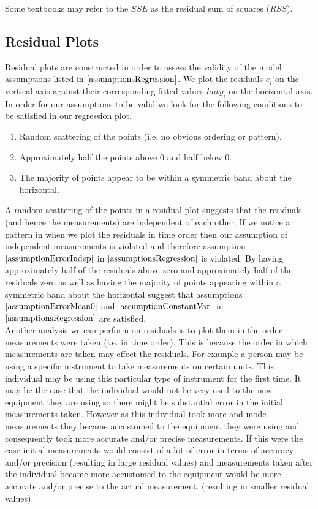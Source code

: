 \begin{nt}
Some textbooks may refer to the $SSE$ as the
residual sum of squares ($RSS$).
\end{nt}

\subsection{Residual Plots}

Residual plots are constructed in order to assess the validity of the model assumptions
listed in $\ref{assumptionsRegression}$.
We plot the residuals $e_{i}$ on the vertical axis
against their corresponding fitted values $hat{y}_{i}$ on the horizontal axis.
In order for our assumptions to be valid we look for the following
conditions to be satisfied in our regression plot.

\begin{enumerate}
\item	Random scattering of the points (i.e. no obvious ordering or pattern).
\item	Approximately half the points above 0 and half below 0.
\item	The majority of points appear to be within a symmetric band about the horizontal.
\end{enumerate}

\noindent
A random scattering of the points in a residual plot suggests
that the residuals (and hence the measurements) 
are independent of each other.
If we notice a pattern in when we plot the residuals in time order
then our assumption of independent measurements is violated
and therefore assumption $\ref{assumptionErrorIndep}$ in $\ref{assumptionsRegression}$
is violated.
By having approximately half of the residuals above zero and 
approximately half of the residuals zero as well as having
the majority of points appearing within a symmetric band about the horizontal
suggest that assumptions $\ref{assumptionErrorMean0}$
and $\ref{assumptionConstantVar}$
in $\ref{assumptionsRegression}$
are satisfied.\\


Another analysis we can perform on residuals is to plot them 
in the order measurements were taken (i.e. in time order).
This is because the order in which measurements are taken may effect
the residuals.
For example a person may be using a specific instrument to
take measurements on certain units.
This individual may be using this particular type of instrument 
for the first time.
It may be the case that the individual would not be very used to 
the new equipment they are using so there might be substantial
error in the initial measurements taken.
However as this individual took more and mode measurements they became  
accustomed to the equipment they were using and consequently took
more accurate and/or precise measurements.
If this were the case initial measurements would consist of a lot of error
in terms of accuracy and/or precision 
(resulting in large residual values)
and measurements taken after the individual became more accustomed to
the equipment would be more accurate and/or precise to the actual measurement.
(resulting in smaller residual values).

